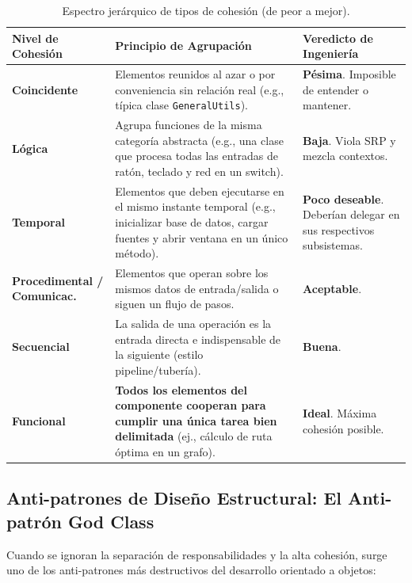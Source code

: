 \begin{table}[htbp]
\centering
\small
\begin{tabularx}{\textwidth}{l p{5cm} X}
\toprule
\textbf{Nivel de Cohesión} & \textbf{Principio de Agrupación} & \textbf{Veredicto de Ingeniería} \\
\midrule
\textbf{Coincidente} & Elementos reunidos al azar o por conveniencia sin relación real (e.g., típica clase \texttt{GeneralUtils}). & \textcolor{alertred}{\textbf{Pésima}}. Imposible de entender o mantener. \\
\addlinespace
\textbf{Lógica} & Agrupa funciones de la misma categoría abstracta (e.g., una clase que procesa todas las entradas de ratón, teclado y red en un switch). & \textcolor{alertred}{\textbf{Baja}}. Viola SRP y mezcla contextos. \\
\addlinespace
\textbf{Temporal} & Elementos que deben ejecutarse en el mismo instante temporal (e.g., inicializar base de datos, cargar fuentes y abrir ventana en un único método). & \textcolor{accent}{\textbf{Poco deseable}}. Deberían delegar en sus respectivos subsistemas. \\
\addlinespace
\textbf{Procedimental / Comunicac.} & Elementos que operan sobre los mismos datos de entrada/salida o siguen un flujo de pasos. & \textcolor{secondary}{\textbf{Aceptable}}. \\
\addlinespace
\textbf{Secuencial} & La salida de una operación es la entrada directa e indispensable de la siguiente (estilo pipeline/tubería). & \textcolor{alertgreen}{\textbf{Buena}}. \\
\addlinespace
\textbf{Funcional} & \textbf{Todos los elementos del componente cooperan para cumplir una única tarea bien delimitada} (ej., cálculo de ruta óptima en un grafo). & \textcolor{alertgreen}{\textbf{Ideal}}. Máxima cohesión posible. \\
\bottomrule
\end{tabularx}
\caption{Espectro jerárquico de tipos de cohesión (de peor a mejor).}
\label{tab:tipos-cohesion}
\end{table}

\subsection{Anti-patrones de Diseño Estructural: El Anti-patrón God Class}

Cuando se ignoran la separación de responsabilidades y la alta cohesión, surge uno de los anti-patrones más destructivos del desarrollo orientado a objetos:

